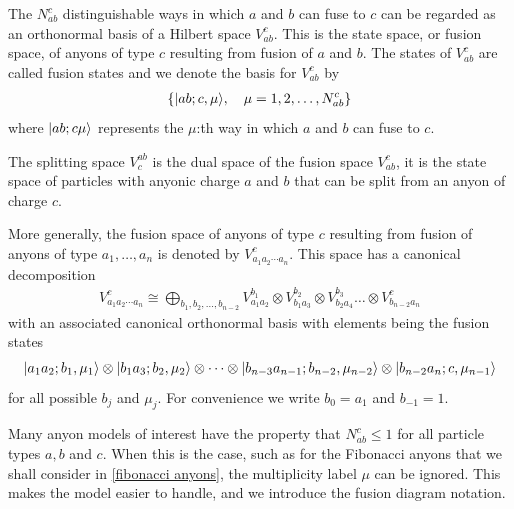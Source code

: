 \documentclass[a4paper,10pt,oneside]{book}
\theoremstyle{plain}
\theoremstyle{definition}
\theoremstyle{remark}
\DeclarePairedDelimiter\ket{\lvert}{\rangle}
\begin{document}


The $N_{ab}^c$ distinguishable ways in which $a$ and $b$ can fuse to $c$ can be regarded as an orthonormal basis of a Hilbert space $V_{ab}^c$. This is the state space, or fusion space, of anyons of type $c$ resulting from fusion of $a$ and $b$. The states of $V_{ab}^c$ are called fusion states and we denote the basis for $V_{ab}^c$ by
\begin{align*}
  \{ \ket{ab;c,\mu}, \quad \mu = 1,2,\ldots,N_{ab}^c \}
\end{align*}
where $\ket{ab;c\mu}$ represents the $\mu$:th way in which $a$ and $b$ can fuse to $c$.

The splitting space $V_c^{ab}$ is the dual space of the fusion space $V_{ab}^c$, it is the state space of particles with anyonic charge $a$ and $b$ that can be split from an anyon of charge $c$.

More generally, the fusion space of anyons of type $c$ resulting from fusion of anyons of type $a_1, \ldots, a_n$ is denoted by $V_{a_1 a_2 \cdots a_n}^c$. This space has a canonical decomposition
\begin{align*}
  V_{a_1 a_2 \cdots a_n}^c \cong \bigoplus_{b_1,b_2,\ldots,b_{n-2}} V_{a_1a_2}^{b_1} \otimes V_{b_1 a_3}^{b_2} \otimes V_{b_2 a_4}^{b_3} \ldots \otimes V_{b_{n-2} a_n}^c
\end{align*}
with an associated canonical orthonormal basis with elements being the fusion states
\begin{align*}
  \ket{a_1 a_2; b_1, \mu_1} \otimes \ket{b_1 a_3; b_2, \mu_2} \otimes \cdots \otimes \ket{b_{n-3} a_{n-1}; b_{n-2}, \mu_{n-2}} \otimes \ket{b_{n-2} a_n; c, \mu_{n-1}}
\end{align*}
for all possible $b_j$ and $\mu_j$. For convenience we write $b_{0} = a_1$ and $b_{-1} = 1$.

Many anyon models of interest have the property that $N_{ab}^c \le 1$ for all particle types $a, b$ and $c$. When this is the case, such as for the Fibonacci anyons that we shall consider in \cref{fibonacci anyons}, the multiplicity label $\mu$ can be ignored. This makes the model easier to handle, and we introduce the fusion diagram notation.
\end{document}
